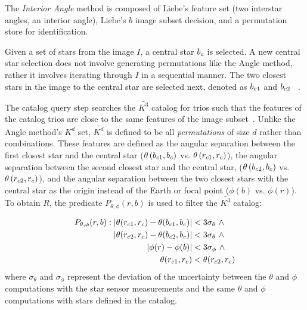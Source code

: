 The \textit{Interior Angle} method is composed of Liebe's feature set (two interstar angles, an interior angle),
Liebe's $b$ image subset decision, and a permutation store for identification.

Given a set of stars from the image $I$, a central star $b_c$ is selected.
A new central star selection does not involve generating permutations like the Angle method, rather it involves
iterating through $I$ in a sequential manner.
The two closest stars in the image to the central star are selected next, denoted as $b_{c1}$ and $b_{c2}$
~\cite{liebe:starTrackersAttitudeDetermination}.

The catalog query step searches the $\bar{K^3}$ catalog for trios such that the features of the catalog trios are
close to the same features of the image subset~\cite{bratt:analysisStarIdentification}.
Unlike the Angle method's $K^d$ set, $\bar{K^d}$ is defined to be all \textit{permutations} of size $d$ rather than
combinations.
These features are defined as the angular separation between the first closest star and the central star
($\theta\left(b_{c1}, b_c\right)$ vs. $ \theta\left(r_{c1}, r_c\right)$), the
angular separation between the second closest star and the central star, ($\theta\left(b_{c2},
b_c\right) $ vs. $\theta\left(r_{c2}, r_c\right)$),
and the angular separation between the two closest stars with the central star as the origin instead of the Earth or 
focal point ($\phi(b) $ vs. $ \phi(r)$).
To obtain $R$, the predicate $P_{\theta, \phi}(r, b)$ is used to filter the $\bar{K^3}$ catalog:

\begin{equation}
    \begin{aligned}
        P_{\theta, \phi} (r, b): \left\lvert \theta(r_{c1}, r_c) - \theta(b_{c1}, b_c)\right\rvert
        &< 3 \sigma_{\theta} \ \land \\ \left\lvert \theta(r_{c2}, r_c) - \theta(b_{c2}, 
        b_c)\right\rvert &< 3 \sigma_{\theta} \ \land \\ \left\lvert \phi(r) - \phi(b)\right\rvert &< 3 
        \sigma_\phi \ \land \\\theta(r_{c1}, r_c) &< \theta(r_{c2}, r_c)
    \end{aligned}
\end{equation}
where $\sigma_{\theta}$ and $\sigma_{\phi}$ represent the deviation of the uncertainty between the $\theta$ and $\phi$
computations with the star sensor measurements and the same $\theta$ and $\phi$ computations with stars defined in the
catalog.

